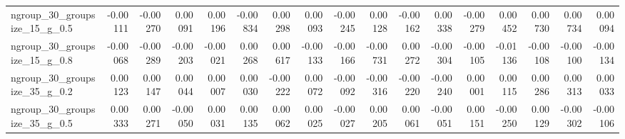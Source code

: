 \documentclass[10pt, a4paper, titlepage]{article}
\begin{document}
\begin{landscape}
\begin{table}[]
{\begin{tabular}{l|rrrr|rrrr|rrrr|rrrr}
ngroup\_30\_groupsize\_15\_g\_0.5 & -0.00111                          & -0.00270                           & 0.00091                            & 0.00196                                 & -0.00834                          & 0.00298                            & 0.00093                            & -0.00245                                & 0.00128                           & -0.00162                           & 0.00338                            & -0.00279                                & 0.00452                           & 0.00730                            & 0.00734                            & 0.00094                                \\
ngroup\_30\_groupsize\_15\_g\_0.8 & -0.00068                          & -0.00289                           & -0.00203                           & -0.00021                                & 0.00268                           & 0.00617                            & -0.00133                           & -0.00166                                & -0.00731                          & 0.00272                            & -0.00304                           & -0.00105                                & -0.01136                          & -0.00108                           & -0.00100                           & -0.00134                               \\
ngroup\_30\_groupsize\_35\_g\_0.2 & 0.00123                           & 0.00147                            & 0.00044                            & 0.00007                                 & 0.00030                           & -0.00222                           & 0.00072                            & -0.00092                                & -0.00316                          & -0.00220                           & -0.00240                           & 0.00001                                 & 0.00115                           & 0.00286                            & 0.00313                            & 0.00033                                \\
ngroup\_30\_groupsize\_35\_g\_0.5 & 0.00333                           & 0.00271                            & -0.00050                           & 0.00031                                 & 0.00135                           & 0.00062                            & 0.00025                            & -0.00027                                & 0.00205                           & 0.00061                            & -0.00051                           & 0.00151                                 & -0.00250                          & 0.00129                            & -0.00302                           & -0.00106                               \\

\end{tabular}}
\end{table}
\end{landscape}
\end{document}
